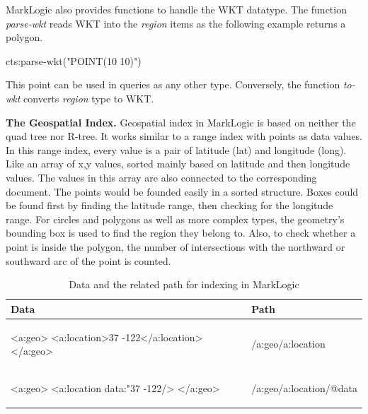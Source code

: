 \documentclass[a4paper,12pt]{article}
\begin{document}
MarkLogic also provides functions to handle the WKT datatype. The function \textit{parse-wkt} reads WKT into the \textit{region} items as the following example returns a polygon.
\vspace{10px}
\begin{fakeJSON}
cts:parse-wkt("POINT(10 10)")
\end{fakeJSON}
\vspace{10px}
This point can be used in queries as any other type. Conversely, the function \textit{to-wkt} converts \textit{region} type to WKT.


\textbf{The Geospatial Index.}
Geospatial index in MarkLogic is based on neither the quad tree nor R-tree. It works similar to a range index with points as data values. In this range index, every value is a pair of latitude (lat) and longitude (long). Like an array of x,y values, sorted mainly based on latitude and then longitude values. The values in this array are also connected to the corresponding document.
The points would be founded easily in a sorted structure. 
Boxes could be found first by finding the latitude range, then checking for the longitude range. 
For circles and polygons as well as more complex types, the geometry's bounding box is used to find the region they belong to. 
Also, to check whether a point is inside the polygon, the number of intersections with the northward or southward arc of the point is counted.
\vspace{10px}
\begin{table}
\centering
\begin{tabular}{|l |l |}\hline
\textbf{Data} & \textbf{Path}\\\hline
\begin{fakeJSON}
<a:geo>
  <a:location>37 -122</a:location>
</a:geo>
\end{fakeJSON} &
\begin{fakeJSON}
/a:geo/a:location
\end{fakeJSON}\\\hline
\begin{fakeJSON}
<a:geo>
  <a:location data:"37 -122/>
</a:geo>
\end{fakeJSON} &
\begin{fakeJSON}
/a:geo/a:location/@data
\end{fakeJSON}
\\\hline
\end{tabular}
\caption{Data and the related path for indexing in MarkLogic}
\label{t.pathindexmarklogic}
\end{table}
\end{document}
